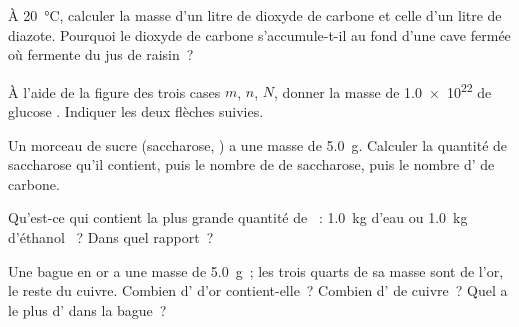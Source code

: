 \begin{exercise}[$\star\star$]\label{exo:g10:the-mole:8}
À \qty{20}{\celsius}, calculer la masse d'un litre de dioxyde de
carbone et celle d'un litre de diazote. Pourquoi le dioxyde de carbone
s'accumule-t-il au fond d'une cave fermée où fermente du jus de
raisin~?
\end{exercise}

\begin{exercise}[$\star\star$]\label{exo:g10:the-mole:9}
À l'aide de la figure des trois cases $m$, $n$, $N$, donner la masse de
\num{1.0e22}  de glucose . Indiquer les deux
flèches suivies.
\end{exercise}

\begin{exercise}[$\star\star$]\label{exo:g10:the-mole:10}
Un morceau de sucre (saccharose, ) a une masse de
\qty{5.0}{g}. Calculer la quantité de saccharose qu'il contient, puis
le nombre de  de saccharose, puis le nombre d' de
carbone.
\end{exercise}

\begin{exercise}[$\star\star$]\label{exo:g10:the-mole:11}
Qu'est-ce qui contient la plus grande quantité de ~:
\qty{1.0}{kg} d'eau  ou \qty{1.0}{kg} d'éthanol ~?
Dans quel rapport~?
\end{exercise}

\begin{exercise}[$\star\star\star$]\label{exo:g10:the-mole:12}
Une bague en or a une masse de \qty{5.0}{g}~; les trois quarts de sa
masse sont de l'or, le reste du cuivre. Combien d' d'or
contient-elle~? Combien d' de cuivre~? Quel  a le plus
d' dans la bague~?
\end{exercise}

